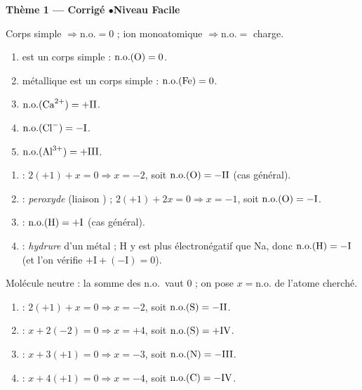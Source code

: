 \documentclass[11pt,a4paper]{article}
\begin{document}
\begin{center}\color{primarydark}\large\bfseries Thème 1 — Corrigé \quad$\bullet$\quad Niveau Facile\end{center}

\begin{corrige}
Corps simple $\Rightarrow \mathrm{n.o.}=0$ ; ion monoatomique $\Rightarrow \mathrm{n.o.}=$ charge.
\begin{enumerate}[label=\alph*)]
  \item {} est un corps simple : $\mathrm{n.o.}(\ce{O})=0$.
  \item {} métallique est un corps simple : $\mathrm{n.o.}(\ce{Fe})=0$.
  \item $\mathrm{n.o.}(\ce{Ca^{2+}})=+\mathrm{II}$.
  \item $\mathrm{n.o.}(\ce{Cl^-})=-\mathrm{I}$.
  \item $\mathrm{n.o.}(\ce{Al^{3+}})=+\mathrm{III}$.
\end{enumerate}
\end{corrige}

\begin{corrige}
\begin{enumerate}[label=\alph*)]
  \item {} : $2(+1)+x=0\Rightarrow x=-2$, soit $\mathrm{n.o.}(\ce{O})=-\mathrm{II}$ (cas général).
  \item {} : \emph{peroxyde} (liaison ) ; $2(+1)+2x=0\Rightarrow x=-1$, soit
        $\mathrm{n.o.}(\ce{O})=-\mathrm{I}$.
  \item {} : $\mathrm{n.o.}(\ce{H})=+\mathrm{I}$ (cas général).
  \item {} : \emph{hydrure} d'un métal ; H y est plus électronégatif que Na, donc
        $\mathrm{n.o.}(\ce{H})=-\mathrm{I}$ (et l'on vérifie $+\mathrm{I}+(-\mathrm{I})=0$).
\end{enumerate}
\end{corrige}

\begin{corrige}
Molécule neutre : la somme des n.o.\ vaut $0$ ; on pose $x=\mathrm{n.o.}$ de l'atome cherché.
\begin{enumerate}[label=\alph*)]
  \item {} : $2(+1)+x=0\Rightarrow x=-2$, soit $\mathrm{n.o.}(\ce{S})=-\mathrm{II}$.
  \item {} : $x+2(-2)=0\Rightarrow x=+4$, soit $\mathrm{n.o.}(\ce{S})=+\mathrm{IV}$.
  \item {} : $x+3(+1)=0\Rightarrow x=-3$, soit $\mathrm{n.o.}(\ce{N})=-\mathrm{III}$.
  \item {} : $x+4(+1)=0\Rightarrow x=-4$, soit $\mathrm{n.o.}(\ce{C})=-\mathrm{IV}$.
\end{enumerate}
\end{corrige}
\end{document}
